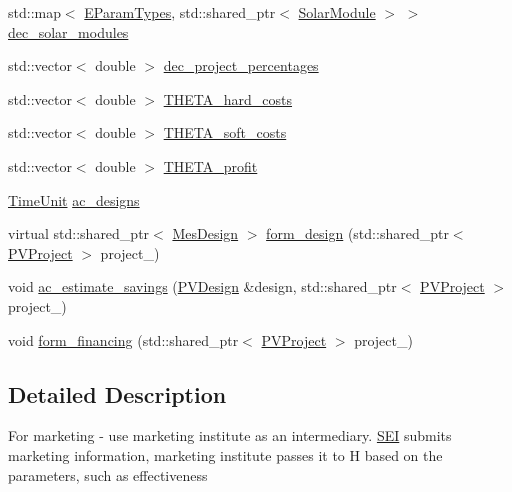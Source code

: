 \begin{DoxyCompactItemize}
\item 
std\+::map$<$ \hyperlink{namespacesolar__core_aa1147341e5ef7a40d68d1bd68e149362}{E\+Param\+Types}, std\+::shared\+\_\+ptr$<$ \hyperlink{classsolar__core_1_1_solar_module}{Solar\+Module} $>$ $>$ \hyperlink{classsolar__core_1_1_s_e_i_a79728143af5752e09c2be29cfa1cfd8f}{dec\+\_\+solar\+\_\+modules}
\item 
std\+::vector$<$ double $>$ \hyperlink{classsolar__core_1_1_s_e_i_a272838ea17b8cd4e49c9a8c53facfd8f}{dec\+\_\+project\+\_\+percentages}
\item 
std\+::vector$<$ double $>$ \hyperlink{classsolar__core_1_1_s_e_i_a4723f6d0e5098b9b2f553c9ef6c5545f}{T\+H\+E\+T\+A\+\_\+hard\+\_\+costs}
\item 
std\+::vector$<$ double $>$ \hyperlink{classsolar__core_1_1_s_e_i_a1be690a943dc872af0ed3540c81f1d6b}{T\+H\+E\+T\+A\+\_\+soft\+\_\+costs}
\item 
std\+::vector$<$ double $>$ \hyperlink{classsolar__core_1_1_s_e_i_a9137f81a58ab1325d8b37590afe267aa}{T\+H\+E\+T\+A\+\_\+profit}
\item 
\hyperlink{namespacesolar__core_a4b5949d07259da6f8a20d12a30403e90}{Time\+Unit} \hyperlink{classsolar__core_1_1_s_e_i_a147ec60ca551d9195cdf5937eda5f903}{ac\+\_\+designs}
\item 
virtual std\+::shared\+\_\+ptr$<$ \hyperlink{classsolar__core_1_1_mes_design}{Mes\+Design} $>$ \hyperlink{classsolar__core_1_1_s_e_i_a807561ad055ddc0df91b80ba406ee6df}{form\+\_\+design} (std\+::shared\+\_\+ptr$<$ \hyperlink{classsolar__core_1_1_p_v_project}{P\+V\+Project} $>$ project\+\_\+)
\item 
void \hyperlink{classsolar__core_1_1_s_e_i_ab84401c625f5c459accf430535e4a06d}{ac\+\_\+estimate\+\_\+savings} (\hyperlink{classsolar__core_1_1_p_v_design}{P\+V\+Design} \&design, std\+::shared\+\_\+ptr$<$ \hyperlink{classsolar__core_1_1_p_v_project}{P\+V\+Project} $>$ project\+\_\+)
\item 
void \hyperlink{classsolar__core_1_1_s_e_i_a7f29b9fee74b984ed9b1c6983b2960e3}{form\+\_\+financing} (std\+::shared\+\_\+ptr$<$ \hyperlink{classsolar__core_1_1_p_v_project}{P\+V\+Project} $>$ project\+\_\+)
\end{DoxyCompactItemize}


\subsection{Detailed Description}
For marketing -\/ use marketing institute as an intermediary. \hyperlink{classsolar__core_1_1_s_e_i}{S\+E\+I} submits marketing information, marketing institute passes it to H based on the parameters, such as effectiveness

